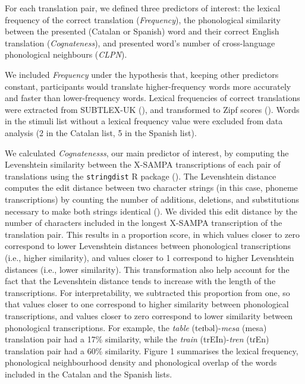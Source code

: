 \documentclass[
]{article}
\begin{document}
For each translation pair, we defined three predictors of interest: the
lexical frequency of the correct translation (\emph{Frequency}), the
phonological similarity between the presented (Catalan or Spanish) word
and their correct English translation (\emph{Cognateness}), and
presented word's number of cross-language phonological neighbours
(\emph{CLPN}).

We included \emph{Frequency} under the hypothesis that, keeping other
predictors constant, participants would translate higher-frequency words
more accurately and faster than lower-frequency words. Lexical
frequencies of correct translations were extracted from SUBTLEX-UK
(), and
transformed to Zipf scores (). Words in the stimuli list without a lexical frequency value
were excluded from data analysis (2 in the Catalan list, 5 in the
Spanish list).

We calculated \emph{Cognatenesss}, our main predictor of interest, by
computing the Levenshtein similarity between the X-SAMPA transcriptions
of each pair of translations using the \texttt{stringdist} R package
(). The Levenshtein
distance computes the edit distance between two character strings (in
this case, phoneme transcriptions) by counting the number of additions,
deletions, and substitutions necessary to make both strings identical
(). We
divided this edit distance by the number of characters included in the
longest X-SAMPA transcription of the translation pair. This results in a
proportion score, in which values closer to zero correspond to lower
Levenshtein distances between phonological transcriptions (i.e., higher
similarity), and values closer to 1 correspond to higher Levenshtein
distances (i.e., lower similarity). This transformation also help
account for the fact that the Levenshtein distance tends to increase
with the length of the transcriptions. For interpretability, we
subtracted this proportion from one, so that values closer to one
correspond to higher similarity between phonological transcriptions, and
values closer to zero correspond to lower similarity between
phonological transcriptions. For example, the \emph{table}
(teɪbəl)-\emph{mesa} (mesa) translation pair had a 17\% similarity,
while the \emph{train} (trEIn)-\emph{tren} (tɾEn) translation pair had a
60\% similarity. Figure 1 summarises the lexical frequency, phonological
neighbourhood density and phonological overlap of the words included in
the Catalan and the Spanish lists.
\end{document}
